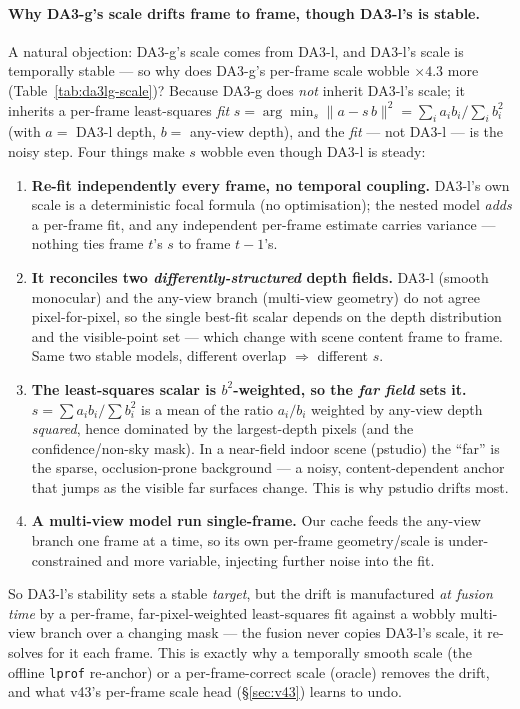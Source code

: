\documentclass[11pt,a4paper]{article}
\begin{document}
\paragraph{Why DA3-g's scale drifts frame to frame, though DA3-l's is stable.}
A natural objection: DA3-g's scale comes from DA3-l, and DA3-l's scale is temporally stable --- so why does
DA3-g's per-frame scale wobble $\times4.3$ more (Table~\ref{tab:da3lg-scale})? Because DA3-g does \emph{not}
inherit DA3-l's scale; it inherits a per-frame least-squares \emph{fit}
$s=\arg\min_s\lVert a-s\,b\rVert^2=\sum_i a_i b_i/\sum_i b_i^2$ (with $a=$ DA3-l depth, $b=$ any-view depth),
and the \emph{fit} --- not DA3-l --- is the noisy step. Four things make $s$ wobble even though DA3-l is steady:
\begin{enumerate}
  \item \textbf{Re-fit independently every frame, no temporal coupling.} DA3-l's own scale is a deterministic
  focal formula (no optimisation); the nested model \emph{adds} a per-frame fit, and any independent
  per-frame estimate carries variance --- nothing ties frame $t$'s $s$ to frame $t{-}1$'s.
  \item \textbf{It reconciles two \emph{differently-structured} depth fields.} DA3-l (smooth monocular) and
  the any-view branch (multi-view geometry) do not agree pixel-for-pixel, so the single best-fit scalar
  depends on the depth distribution and the visible-point set --- which change with scene content frame to
  frame. Same two stable models, different overlap $\Rightarrow$ different $s$.
  \item \textbf{The least-squares scalar is $b^2$-weighted, so the \emph{far field} sets it.}
  $s=\sum a_i b_i/\sum b_i^2$ is a mean of the ratio $a_i/b_i$ weighted by any-view depth \emph{squared},
  hence dominated by the largest-depth pixels (and the confidence/non-sky mask). In a near-field indoor
  scene (pstudio) the ``far'' is the sparse, occlusion-prone background --- a noisy, content-dependent
  anchor that jumps as the visible far surfaces change. This is why pstudio drifts most.
  \item \textbf{A multi-view model run single-frame.} Our cache feeds the any-view branch one frame at a
  time, so its own per-frame geometry/scale is under-constrained and more variable, injecting further noise
  into the fit.
\end{enumerate}
So DA3-l's stability sets a stable \emph{target}, but the drift is manufactured \emph{at fusion time} by a
per-frame, far-pixel-weighted least-squares fit against a wobbly multi-view branch over a changing mask ---
the fusion never copies DA3-l's scale, it re-solves for it each frame. This is exactly why a temporally
smooth scale (the offline \texttt{lprof} re-anchor) or a per-frame-correct scale (oracle) removes the drift,
and what v43's per-frame scale head (\S\ref{sec:v43}) learns to undo.
\end{document}
